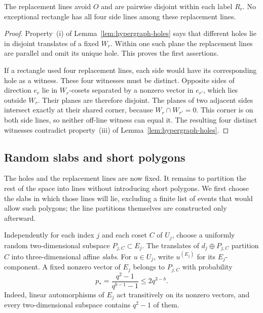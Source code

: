 \begin{lemma}\label{lem:hypergraph-replacement-lines}
The replacement lines avoid $O$ and are pairwise disjoint within
each label $R_r$.  No exceptional rectangle has all four side lines
among these replacement lines.
\end{lemma}

\begin{proof}
Property~\textup{(i)} of Lemma~\ref{lem:hypergraph-holes} says that
different holes lie in disjoint translates of a fixed $W_r$.
Within one such plane the replacement lines are parallel and omit
its unique hole.  This proves the first assertions.

If a rectangle used four replacement lines, each side would have
its corresponding hole as a witness.  These four witnesses must
be distinct.  Opposite sides of direction $e_r$ lie in $W_r$-cosets
separated by a nonzero vector in $e_{r'}$, which lies outside $W_r$.
Their planes are therefore disjoint.  The planes of two adjacent
sides intersect exactly at their shared corner, because
$W_r\cap W_{r'}=0$.  This corner is on both side lines, so neither
off-line witness can equal it.  The resulting four distinct witnesses
contradict property~\textup{(iii)} of Lemma~\ref{lem:hypergraph-holes}.
\end{proof}

\subsection{Random slabs and short polygons}

The holes and the replacement lines are now fixed. It remains to
partition the rest of the space into lines without introducing short
polygons. We first choose the slabs in which those lines will lie,
excluding a finite list of events that would allow such polygons;
the line partitions themselves are constructed only afterward.

Independently for each index $j$ and each coset $C$ of $U_j$, choose
a uniformly random two-dimensional subspace $P_{j,C}\subset E_j$.
The translates of $d_j\oplus P_{j,C}$ partition $C$ into
three-dimensional affine \emph{slabs}.  For $u\in U_j$, write
$u^{(E_j)}$ for its
$E_j$-component.  A fixed nonzero vector of $E_j$ belongs to $P_{j,C}$
with probability
\begin{equation}\label{eq:hypergraph-inclusion-probability}
 p_* = \frac{q^2-1}{q^{b-1}-1}\le 2q^{3-b}.
\end{equation}
Indeed, linear automorphisms of $E_j$ act transitively on its nonzero
vectors, and every two-dimensional subspace contains $q^2-1$ of them.

